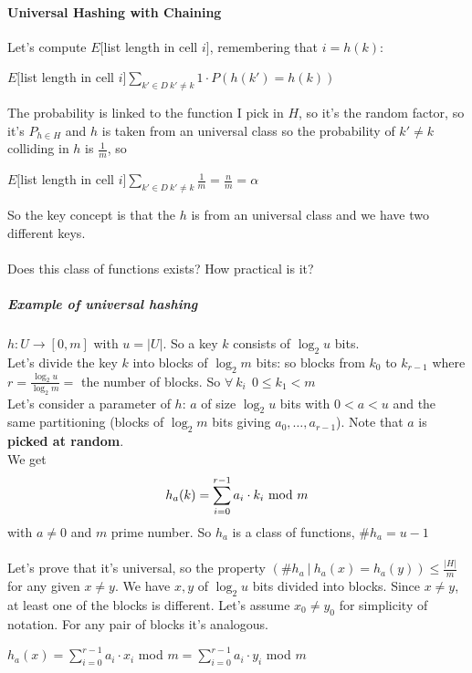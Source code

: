 \documentclass[10pt]{report}
\begin{document}
\paragraph{Universal Hashing with Chaining} Let's compute $E[$list length in cell $i]$, remembering that $i = h(k)$:
\begin{list}{}{}
	\item $E[$list length in cell $i] \sum_{k'\in D\:k'\neq k} 1\cdot P(h(k')=h(k))$
\end{list}
The probability is linked to the function I pick in $H$, so it's the random factor, so it's $P_{h\in H}$ and $h$ is taken from an universal class so the probability of $k'\neq k$ colliding in $h$ is $\frac{1}{m}$, so\begin{list}{}{}
	\item $E[$list length in cell $i] \sum_{k'\in D\:k'\neq k} \frac{1}{m} = \frac{n}{m} = \alpha$
\end{list}
So the key concept is that the $h$ is from an universal class and we have two different keys.\\\\
Does this class of functions exists? How practical is it?
\subparagraph{Example of universal hashing} $h:U\rightarrow [0,m]$ with $u=|U|$. So a key $k$ consists of $\log_2 u$ bits.\\
Let's divide the key $k$ into blocks of $\log_2 m$ bits: so blocks from $k_0$ to $k_{r-1}$ where $r=\frac{\log_2 u}{\log_2 m} =$ the number of blocks. So $\forall\:k_i\:\:0\leq k_1< m$\\
Let's consider a parameter of $h$: $a$ of size $\log_2 u$ bits with $0 < a < u$ and the same partitioning (blocks of $\log_2 m$ bits giving $a_0,\ldots,a_{r-1}$). Note that $a$ is \textbf{picked at random}.\\
We get $$h_a(k) = \sum_{i=0}^{r-1} a_i\cdot k_i\hbox{ mod }m$$ with $a\neq 0$ and $m$ prime number. So $h_a$ is a class of functions, $\# h_a = u-1$\\\\
Let's prove that it's universal, so the property $(\# h_a\:|\:h_a(x)=h_a(y))\leq\frac{|H|}{m}$ for any given $x\neq y$. We have $x,y$ of $\log_2 u$ bits divided into blocks. Since $x\neq y$, at least one of the blocks is different. Let's assume $x_0\neq y_0$ for simplicity of notation. For any pair of blocks it's analogous.\begin{list}{}{}
	\item $h_a(x) = \sum_{i=0}^{r-1} a_i\cdot x_i$ mod $m = \sum_{i=0}^{r-1}a_i\cdot y_i$ mod $m$
\end{list}
\end{document}
